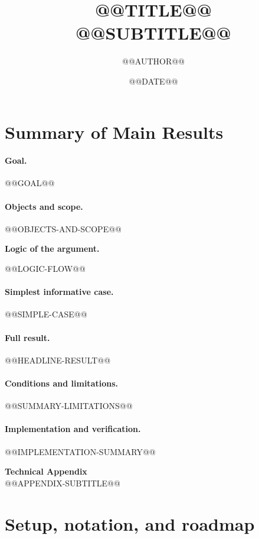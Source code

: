 \documentclass[11pt]{article}
\title{\textbf{@@TITLE@@}\\[0.5em]\large @@SUBTITLE@@}
\author{@@AUTHOR@@}
\date{@@DATE@@}
\numberwithin{equation}{section}
\theoremstyle{definition}
\theoremstyle{remark}
\newenvironment{noteboxed}[1]{%
  \par\medskip\noindent
  \begingroup
  \setlength{\fboxsep}{0.75em}%
  \setlength{\fboxrule}{0.45pt}%
  \begin{lrbox}{\notebox}%
  \begin{minipage}{\dimexpr\linewidth-2\fboxsep-2\fboxrule\relax}%
  \textbf{#1}\par\smallskip
}{%
  \end{minipage}%
  \end{lrbox}%
  \fbox{\usebox{\notebox}}%
  \endgroup
  \par\medskip
}
\begin{document}
\maketitle

\section{Summary of Main Results}\label{sec:summary}

\paragraph{Goal.}
@@GOAL@@

\paragraph{Objects and scope.}
@@OBJECTS-AND-SCOPE@@

\begin{noteboxed}{Logic of the argument.}
\centering
@@LOGIC-FLOW@@
\end{noteboxed}

\paragraph{Simplest informative case.}
@@SIMPLE-CASE@@

\paragraph{Full result.}
@@HEADLINE-RESULT@@

\paragraph{Conditions and limitations.}
@@SUMMARY-LIMITATIONS@@

\paragraph{Implementation and verification.}
@@IMPLEMENTATION-SUMMARY@@

\newpage
\begin{center}
{\LARGE\textbf{Technical Appendix}}\\[2mm]
{\large @@APPENDIX-SUBTITLE@@}
\end{center}

\appendix

\section{Setup, notation, and roadmap}\label{app:setup}
\end{document}
